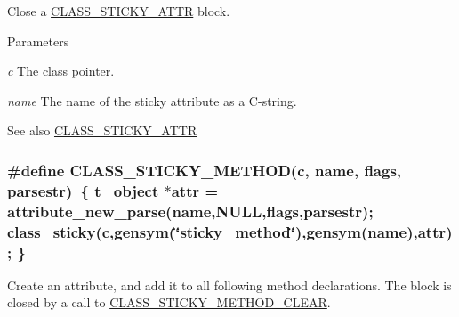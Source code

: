 Close a \hyperlink{group__attr_ga51ce88a6d20e819ad703514e583e5562}{CLASS\_\-STICKY\_\-ATTR} block. 
\begin{DoxyParams}{Parameters}
\item[{\em c}]The class pointer. \item[{\em name}]The name of the sticky attribute as a C-\/string. \end{DoxyParams}
\begin{DoxySeeAlso}{See also}
\hyperlink{group__attr_ga51ce88a6d20e819ad703514e583e5562}{CLASS\_\-STICKY\_\-ATTR} 
\end{DoxySeeAlso}
\hypertarget{group__attr_ga864386ce13dd707052d2fef6bc927576}{
\subsubsection[{CLASS\_\-STICKY\_\-METHOD}]{\setlength{\rightskip}{0pt plus 5cm}\#define CLASS\_\-STICKY\_\-METHOD(c, \/  name, \/  flags, \/  parsestr)~\{ {\bf t\_\-object} $\ast$attr = attribute\_\-new\_\-parse(name,NULL,flags,parsestr); class\_\-sticky(c,gensym(\char`\"{}sticky\_\-method\char`\"{}),gensym(name),attr); \}}}
\label{group__attr_ga864386ce13dd707052d2fef6bc927576}


Create an attribute, and add it to all following method declarations. The block is closed by a call to \hyperlink{group__attr_gaa7a445747716396d70d8fa6fb65861dc}{CLASS\_\-STICKY\_\-METHOD\_\-CLEAR}.


